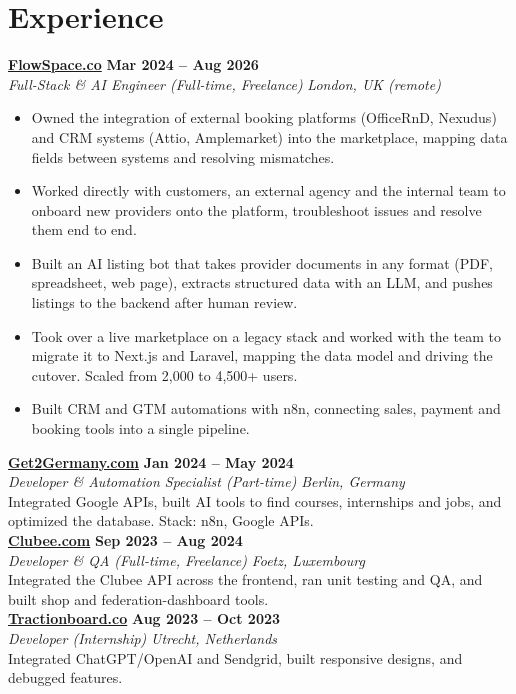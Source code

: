 \documentclass[a4paper,10pt]{article}
\newcommand{\role}[4]{%
 \textbf{#1} \hfill \textbf{#2}\\[1pt]%
 \textit{#3} \hfill \textit{#4}\\[2pt]%
}
\begin{document}
\section{Experience}

\role{\href{https://flowspace.co}{FlowSpace.co}}{Mar 2024 -- Aug 2026}{Full-Stack \& AI Engineer (Full-time, Freelance)}{London, UK (remote)}
\begin{itemize}
 \item Owned the integration of external booking platforms (OfficeRnD, Nexudus) and CRM systems (Attio, Amplemarket) into the marketplace, mapping data fields between systems and resolving mismatches.
 \item Worked directly with customers, an external agency and the internal team to onboard new providers onto the platform, troubleshoot issues and resolve them end to end.
 \item Built an AI listing bot that takes provider documents in any format (PDF, spreadsheet, web page), extracts structured data with an LLM, and pushes listings to the backend after human review.
 \item Took over a live marketplace on a legacy stack and worked with the team to migrate it to Next.js and Laravel, mapping the data model and driving the cutover. Scaled from 2,000 to 4,500+ users.
 \item Built CRM and GTM automations with n8n, connecting sales, payment and booking tools into a single pipeline.
\end{itemize}

\role{\href{https://get2germany.com}{Get2Germany.com}}{Jan 2024 -- May 2024}{Developer \& Automation Specialist (Part-time)}{Berlin, Germany}
Integrated Google APIs, built AI tools to find courses, internships and jobs, and optimized the database. Stack: n8n, Google APIs.\\[1pt]

\role{\href{https://clubee.com}{Clubee.com}}{Sep 2023 -- Aug 2024}{Developer \& QA (Full-time, Freelance)}{Foetz, Luxembourg}
Integrated the Clubee API across the frontend, ran unit testing and QA, and built shop and federation-dashboard tools.\\[1pt]

\role{\href{https://tractionboard.co}{Tractionboard.co}}{Aug 2023 -- Oct 2023}{Developer (Internship)}{Utrecht, Netherlands}
Integrated ChatGPT/OpenAI and Sendgrid, built responsive designs, and debugged features.
\end{document}
